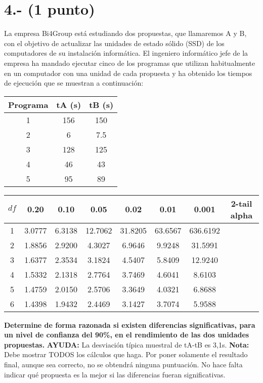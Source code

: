 \documentclass[a4paper,12pt]{article}
\begin{document}
\section*{4.- (1 punto)}
La empresa Bi4Group está estudiando dos propuestas, que llamaremos A y B, con el objetivo de actualizar las unidades de estado sólido (SSD) de los computadores de su instalación informática. El ingeniero informático jefe de la empresa ha mandado ejecutar cinco de los programas que utilizan habitualmente en un computador con una unidad de cada propuesta y ha obtenido los tiempos de ejecución que se muestran a continuación:

\begin{center}
\begin{tabular}{|c|c|c|}
\hline
Programa & tA (s) & tB (s) \\
\hline
1 & 156 & 150 \\
2 & 6 & 7.5 \\
3 & 128 & 125 \\
4 & 46 & 43 \\
5 & 95 & 89 \\
\hline
\end{tabular}
\end{center}

\begin{center}
\begin{tabular}{|c|c|c|c|c|c|c|c|}
\hline
$\mathit{df}$ & 0.20 & 0.10 & 0.05 & 0.02 & 0.01 & 0.001 & 2-tail alpha\\
\hline
1 & 3.0777 & 6.3138 & 12.7062 & 31.8205 & 63.6567 & 636.6192 &\\
2 & 1.8856 & 2.9200 & 4.3027 & 6.9646 & 9.9248 & 31.5991 &\\
3 & 1.6377 & 2.3534 & 3.1824 & 4.5407 & 5.8409 & 12.9240 &\\
4 & 1.5332 & 2.1318 & 2.7764 & 3.7469 & 4.6041 & 8.6103 &\\
5 & 1.4759 & 2.0150 & 2.5706 & 3.3649 & 4.0321 & 6.8688 &\\
6 & 1.4398 & 1.9432 & 2.4469 & 3.1427 & 3.7074 & 5.9588 &\\
\hline
\end{tabular}
\end{center}

\noindent
\textbf{Determine de forma razonada si existen diferencias significativas, para un nivel de confianza del 90\%, en el rendimiento de las dos unidades propuestas.} \textbf{AYUDA:} La desviación típica muestral de tA-tB es 3,1s. \textbf{Nota:} Debe mostrar TODOS los cálculos que haga. Por poner solamente el resultado final, aunque sea correcto, no se obtendrá ninguna puntuación. No hace falta indicar qué propuesta es la mejor si las diferencias fueran significativas. \\\\
\end{document}
